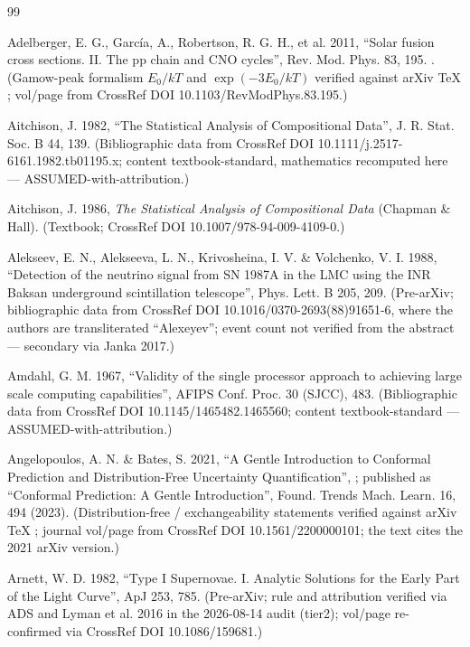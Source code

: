 \begingroup
\raggedright
\begin{thebibliography}{99}

Adelberger, E. G., Garc\'ia, A., Robertson, R. G. H., et al. 2011, ``Solar fusion cross sections. II. The pp chain and CNO cycles'', Rev. Mod. Phys. 83, 195. . (Gamow-peak formalism $E_0/kT$ and $\exp(-3E_0/kT)$ verified against arXiv TeX ; vol/page from CrossRef DOI 10.1103/RevModPhys.83.195.)

Aitchison, J. 1982, ``The Statistical Analysis of Compositional Data'', J. R. Stat. Soc. B 44, 139. (Bibliographic data from CrossRef DOI 10.1111/j.2517-6161.1982.tb01195.x; content textbook-standard, mathematics recomputed here --- ASSUMED-with-attribution.)

Aitchison, J. 1986, \emph{The Statistical Analysis of Compositional Data} (Chapman \& Hall). (Textbook; CrossRef DOI 10.1007/978-94-009-4109-0.)

Alekseev, E. N., Alekseeva, L. N., Krivosheina, I. V. \& Volchenko, V. I. 1988, ``Detection of the neutrino signal from SN 1987A in the LMC using the INR Baksan underground scintillation telescope'', Phys. Lett. B 205, 209. (Pre-arXiv; bibliographic data from CrossRef DOI 10.1016/0370-2693(88)91651-6, where the authors are transliterated ``Alexeyev''; event count not verified from the abstract --- secondary via Janka 2017.)

Amdahl, G. M. 1967, ``Validity of the single processor approach to achieving large scale computing capabilities'', AFIPS Conf. Proc. 30 (SJCC), 483. (Bibliographic data from CrossRef DOI 10.1145/1465482.1465560; content textbook-standard --- ASSUMED-with-attribution.)

Angelopoulos, A. N. \& Bates, S. 2021, ``A Gentle Introduction to Conformal Prediction and Distribution-Free Uncertainty Quantification'', ; published as ``Conformal Prediction: A Gentle Introduction'', Found. Trends Mach. Learn. 16, 494 (2023). (Distribution-free / exchangeability statements verified against arXiv TeX ; journal vol/page from CrossRef DOI 10.1561/2200000101; the text cites the 2021 arXiv version.)

Arnett, W. D. 1982, ``Type I Supernovae. I. Analytic Solutions for the Early Part of the Light Curve'', ApJ 253, 785. (Pre-arXiv; rule and attribution verified via ADS and Lyman et al. 2016 in the 2026-08-14 audit (tier2); vol/page re-confirmed via CrossRef DOI 10.1086/159681.)


\end{thebibliography}
